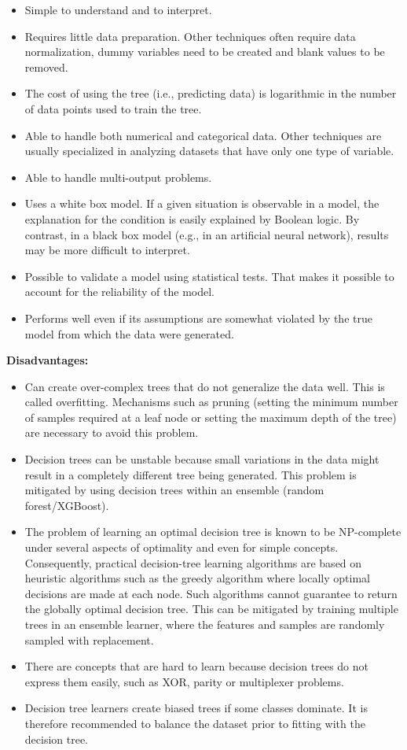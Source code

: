 \documentclass[12pt]{report}
\begin{document}
\begin{itemize}
\item Simple to understand and to interpret.
\item Requires little data preparation. Other techniques often require data normalization, dummy variables need to be created and blank values to be removed.
\item The cost of using the tree (i.e., predicting data) is logarithmic in the number of data points used to train the tree.
\item Able to handle both numerical and categorical data. Other techniques are usually specialized in analyzing datasets that have only one type of variable.
\item Able to handle multi-output problems.
\item Uses a white box model. If a given situation is observable in a model, the explanation for the condition is easily explained by Boolean logic. By contrast, in a black box model (e.g., in an artificial neural network), results may be more difficult to interpret.
\item Possible to validate a model using statistical tests. That makes it possible to account for the reliability of the model.
\item Performs well even if its assumptions are somewhat violated by the true model from which the data were generated.
\end{itemize}

\textbf{Disadvantages:}

\begin{itemize}
\item Can create over-complex trees that do not generalize the data well. This is called overfitting. Mechanisms such as pruning (setting the minimum number of samples required at a leaf node or setting the maximum depth of the tree) are necessary to avoid this problem.
\item Decision trees can be unstable because small variations in the data might result in a completely different tree being generated. This problem is mitigated by using decision trees within an ensemble (random forest/XGBoost).
\item The problem of learning an optimal decision tree is known to be NP-complete under several aspects of optimality and even for simple concepts. Consequently, practical decision-tree learning algorithms are based on heuristic algorithms such as the greedy algorithm where locally optimal decisions are made at each node. Such algorithms cannot guarantee to return the globally optimal decision tree. This can be mitigated by training multiple trees in an ensemble learner, where the features and samples are randomly sampled with replacement.
\item There are concepts that are hard to learn because decision trees do not express them easily, such as XOR, parity or multiplexer problems.
\item Decision tree learners create biased trees if some classes dominate. It is therefore recommended to balance the dataset prior to fitting with the decision tree.
\end{itemize}
\end{document}
